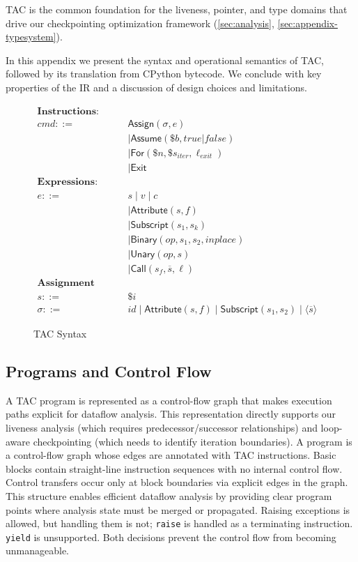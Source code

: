 TAC is the common foundation for the liveness, pointer, and type domains that drive our checkpointing optimization framework (\autoref{sec:analysis}, \autoref{sec:appendix-typesystem}).

In this appendix we present the syntax and operational semantics of TAC, followed by its translation from CPython bytecode.  
We conclude with key properties of the IR and a discussion of design choices and limitations.


\begin{figure}[t]
\centering
\[
\begin{aligned}
\textbf{Instructions:} && \\
cmd ::= \;& \mathsf{Assign}(\sigma, e) \\
      &\mid \mathsf{Assume}(\$b, true|false) \\
      &\mid \mathsf{For}(\$n, \$s_{\mathit{iter}}, \ell_{\mathit{exit}}) \\
      &\mid \mathsf{Exit} \\[1ex]
\textbf{Expressions:} && \\
e ::= \;& s \mid v \mid c \\
 &\mid \mathsf{Attribute}(s, f) \\
 &\mid \mathsf{Subscript}(s_1, s_k) \\
 &\mid \mathsf{Binary}(op, s_1, s_2, inplace) \\
 &\mid \mathsf{Unary}(op, s) \\
 &\mid \mathsf{Call}(s_f, \overline{s}, \ell) \\[1ex]
\textbf{Assignment Targets:} && \\
s ::= \;& \mathsf{\$}i \\
\sigma ::= \;& id \mid \mathsf{Attribute}(s,f) \mid \mathsf{Subscript}(s_1,s_2) \mid \langle\overline{s}\rangle
\end{aligned}
\]
\caption{TAC Syntax}
\label{fig:tac-syntax}
\end{figure}

\subsection{Programs and Control Flow}

A TAC program is represented as a control-flow graph that makes execution paths explicit for dataflow analysis. This representation directly supports our liveness analysis (which requires predecessor/successor relationships) and loop-aware checkpointing (which needs to identify iteration boundaries).
A program is a control-flow graph whose edges are annotated with TAC instructions.
Basic blocks contain straight-line instruction sequences with no internal control flow. Control transfers occur only at block boundaries via explicit edges in the graph. This structure enables efficient dataflow analysis by providing clear program points where analysis state must be merged or propagated.
Raising exceptions is allowed, but handling them is not; \texttt{raise} is handled as a terminating instruction. \texttt{yield} is unsupported. Both decisions prevent the control flow from becoming unmanageable. 

